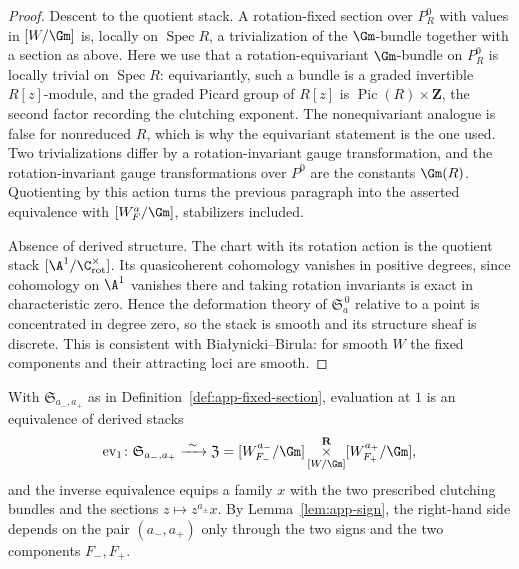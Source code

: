 \begin{proof}
Descent to the quotient stack.  A rotation-fixed section over \(P^0_R\) with
values in \([W/\Gm]\) is, locally on \(\operatorname{Spec}R\), a trivialization
of the \(\Gm\)-bundle together with a section as above.  Here we use that a
rotation-equivariant \(\Gm\)-bundle on \(P^0_R\) is locally trivial on
\(\operatorname{Spec}R\): equivariantly, such a bundle is a graded invertible
\(R[z]\)-module, and the graded Picard group of \(R[z]\) is
\(\operatorname{Pic}(R)\times\mathbf Z\), the second factor recording the
clutching exponent.  The nonequivariant analogue is false for nonreduced
\(R\), which is why the equivariant statement is the one used.  Two
trivializations
differ by a rotation-invariant gauge transformation, and the rotation-invariant
gauge transformations over \(P^0\) are the constants \(\Gm(R)\).  Quotienting
by this action turns the previous paragraph into the asserted equivalence with
\([W_F^a/\Gm]\), stabilizers included.

Absence of derived structure.  The chart with its rotation action is the
quotient stack \([\A^1/\C^\times_{\mathrm{rot}}]\).  Its quasicoherent
cohomology vanishes in positive degrees, since cohomology on \(\A^1\) vanishes
there and taking rotation invariants is exact in characteristic zero.  Hence
the deformation theory of \(\mathfrak S^{\,0}_a\) relative to a point is
concentrated in degree zero, so the stack is smooth and its structure sheaf is
discrete.  This is consistent with Bia{\l}ynicki--Birula: for smooth \(W\) the
fixed components and their attracting loci are smooth.
\end{proof}

\begin{proposition}
\label{prop:app-descent}
With \(\mathfrak S_{a_-,a_+}\) as in Definition~\ref{def:app-fixed-section},
evaluation at \(1\) is an equivalence of derived stacks
\[
 \operatorname{ev}_1\colon\mathfrak S_{a_-,a_+}
 \xrightarrow{\ \sim\ }
 \mathfrak Z=
 [W_{F_-}^{a_-}/\Gm]\mathop{\times}^{\mathbf R}_{[W/\Gm]}
 [W_{F_+}^{a_+}/\Gm],
\]
and the inverse equivalence equips a family \(x\) with the two prescribed
clutching bundles and the sections \(z\mapsto z^{a_\pm}x\).  By
Lemma~\ref{lem:app-sign}, the right-hand side depends on the pair
\((a_-,a_+)\) only through the two signs and the two components
\(F_-,F_+\).
\end{proposition}

